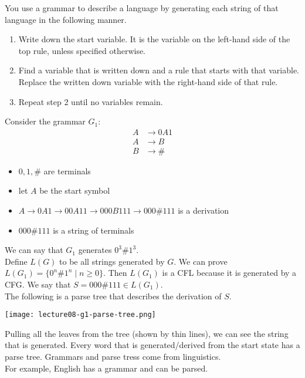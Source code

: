 \documentclass[11pt,a4paper]{article}
\begin{document}
You use a grammar to describe a language by generating each string of that language in the following manner.
\begin{enumerate}
    \item Write down the start variable. It is the variable on the left-hand side of the top rule, unless specified otherwise.
    \item Find a variable that is written down and a rule that starts with that variable. Replace the written down variable with the right-hand side of that rule.
    \item Repeat step 2 until no variables remain. \\
\end{enumerate}

\begin{example}
    Consider the grammar $G_1$:
    \begin{align*}
        A & \rightarrow 0A1 \\
        A & \rightarrow B \\
        B & \rightarrow\#
    \end{align*}

    \begin{itemize}
        \item $0,1,\#$ are terminals
        \item let $A$ be the start symbol
        \item $A\rightarrow 0A1\rightarrow 00A11\rightarrow 000B111\rightarrow 000\#111$ is a derivation
        \item $000\#111$ is a string of terminals
    \end{itemize}

    We can say that $G_1$ generates $0^3\#1^3$. \\

    Define $L(G)$ to be all strings generated by $G$. We can prove $L(G_1)=\{0^n\#1^n\mid n\geq 0\}$. Then $L(G_1)$ is a CFL because it is generated by a CFG.
    We say that $S=000\#111\in L(G_1).$ \\

    The following is a parse tree that describes the derivation of $S$.

    \texttt{[image: lecture08-g1-parse-tree.png]}

    Pulling all the leaves from the tree (shown by thin lines), we can see the string that is generated.
    Every word that is generated/derived from the start state has a parse tree.
    Grammars and parse tress come from linguistics. \\

    For example, English has a grammar and can be parsed.
\end{example}
\end{document}
